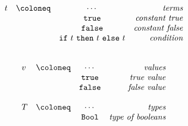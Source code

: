 \begin{minipage}{0.45\textwidth}
  \[
    \begin{array}{lccr}
      t &\coloneq & \cdots &\emph{terms} \\
      & &\mathtt{true} & \emph{constant true} \\
      & & \mathtt{false} & \emph{constant false} \\
      & & \mathtt{if}~t~\mathtt{then}~t~\mathtt{else}~t & \emph{condition} \\
    \end{array}
  \]
\end{minipage}
\hfill
\begin{minipage}{0.45\textwidth}
  \[
    \begin{array}{lccr}
      \\
      v &\coloneq&  \cdots &\emph{values} \\
      && \mathtt{true} & \emph{true value} \\
      &&\mathtt{false} & \emph{false value} \\
      \\
      T &\coloneq&  \cdots &\emph{types} \\
      & &  \mathtt{Bool} & \emph{type of booleans}
    \end{array}
  \]
\end{minipage}
\hfill
\vspace{2em}

